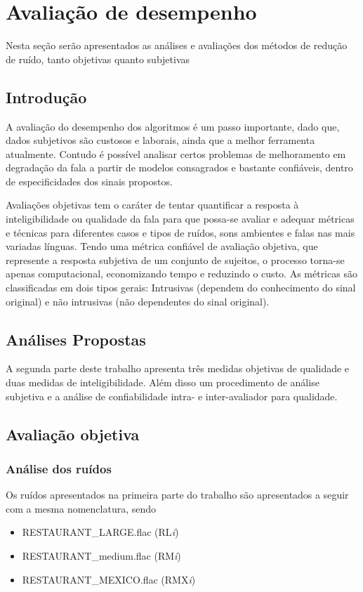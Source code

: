 \chapter{Avaliação de desempenho}
Nesta seção serão apresentados as análises e avaliações dos métodos de redução de ruído, tanto objetivas quanto subjetivas
\section{Introdução}
A avaliação do desempenho dos algoritmos é um passo importante, dado que, dados subjetivos são custosos e laborais, ainda que a melhor ferramenta atualmente. Contudo é possível analisar certos problemas de melhoramento em degradação da fala a partir de modelos consagrados e bastante confiáveis, dentro de especificidades dos sinais propostos.

Avaliações objetivas tem o caráter de tentar quantificar a resposta à inteligibilidade ou qualidade da fala para que possa-se avaliar e adequar métricas e técnicas para diferentes casos e tipos de ruídos, sons ambientes e falas nas mais variadas línguas. Tendo uma métrica confiável de avaliação objetiva, que represente a resposta subjetiva de um conjunto de sujeitos, o processo torna-se apenas computacional, economizando tempo e reduzindo o custo. As métricas são classificadas em dois tipos gerais: Intrusivas (dependem do conhecimento do sinal original) e não intrusivas (não dependentes do sinal original).

\section{Análises Propostas}
A segunda parte deste trabalho apresenta três medidas objetivas de qualidade e duas medidas de inteligibilidade. Além disso um procedimento de análise subjetiva e a análise de confiabilidade intra- e inter-avaliador para qualidade.

\section{Avaliação objetiva}

\subsection{Análise dos ruídos}
Os ruídos apresentados na primeira parte do trabalho são apresentados a seguir com a mesma nomenclatura, sendo

\begin{itemize}
    \item RESTAURANT\_LARGE.flac (RL\textit{i})
    \item RESTAURANT\_medium.flac (RM\textit{i})
    \item RESTAURANT\_MEXICO.flac (RMX\textit{i})
\end{itemize}

